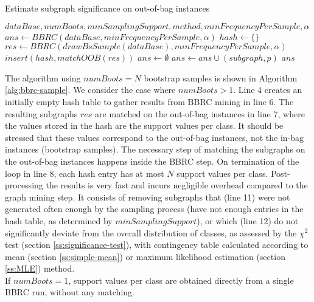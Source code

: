 \documentclass{article}
\begin{document}
\renewcommand{\algorithmicrequire}{\textbf{Input:}}
\renewcommand{\algorithmicensure}{\textbf{Output:}}
\begin{algorithm}[t]
  \caption{Estimate subgraph significance on out-of-bag instances}
  \label{alg:bbrc-sample}
  {\small \begin{algorithmic}[1]
  \Require $dataBase, numBoots, minSamplingSupport, method, minFrequencyPerSample, \alpha$
    \State $ans \gets BBRC(dataBase, minFrequencyPerSample, \alpha)$
  \Else
    \State $hash \gets \{\}$
     
        \State $res \gets BBRC(drawBsSample(dataBase), minFrequencyPerSample, \alpha)$
      \State $insert(hash,matchOOB(res))$
    \EndFor
    \State $ans \gets \emptyset$
          \State $ans\gets ans \cup (subgraph,p)$
        \EndIf
      \EndIf
    \EndFor
  \EndIf
  \Ensure $ans$
\end{algorithmic}}
\end{algorithm}
The algorithm using $numBoots=N$ bootstrap samples is shown in Algorithm
\ref{alg:bbrc-sample}.  We consider the case where $numBoots>1$.  Line 4
creates an initially empty hash table to gather results from BBRC mining in
line 6. The resulting subgraphs $res$ are matched on the out-of-bag instances
in line 7, where the values stored in the hash are the support values per
class. It should be stressed that these values correspond to the out-of-bag
instances, not the in-bag instances (bootstrap samples). The necessary step of
matching the subgraphs on the out-of-bag instances happens inside the BBRC
step. On termination of the loop in line 8, each hash entry has at most $N$
support values per class.  Post-processing the results is very fast and incurs
negligible overhead compared to the graph mining step. It consists of removing
subgraphs that (line 11) were not generated often enough by the sampling
process (have not enough entries in the hash table, as determined by
$minSamplingSupport$), or which (line 12) do not significantly deviate from the
overall distribution of classes, as assessed by the $\chi^2$ test (section
\ref{ss:significance-test}), with contingency table calculated according to
mean (section \ref{ss:simple-mean}) or maximum likelihood estimation (section
\ref{ss:MLE}) method.\\ If $numBoots=1$, support values per class are
obtained directly from a single BBRC run, without any matching.
\end{document}
